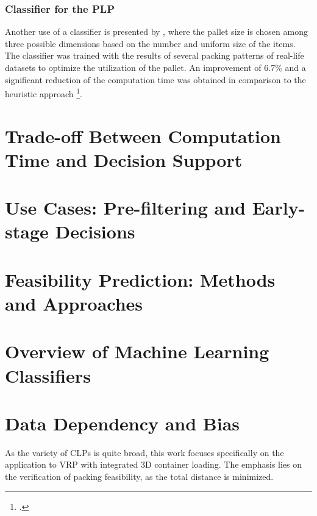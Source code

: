 \subsubsection{Classifier for the \gls{PLP}}
Another use of a classifier is presented by \citeauthor{aylak_application_2021}, where the pallet
size is chosen among three possible dimensions based on the number and uniform size of the items.
The classifier was trained with the results of several packing patterns of real-life datasets
to optimize the utilization of the pallet. An improvement of $6.7\%$ and a significant reduction
of the computation time was obtained in comparison to the heuristic approach
\footcite[cf.][pp. 12--14]{aylak_application_2021}.


\section{Trade-off Between Computation Time and Decision Support}
\section{Use Cases: Pre-filtering and Early-stage Decisions}
\section{Feasibility Prediction: Methods and Approaches}
\section{Overview of Machine Learning Classifiers}
\section{Data Dependency and Bias}






As the variety of \gls{CLP}s is quite broad, this work focuses specifically on
the application to \gls{VRP} with integrated \gls{3D} container loading. The emphasis lies
on the verification of packing feasibility, as the total distance is minimized.